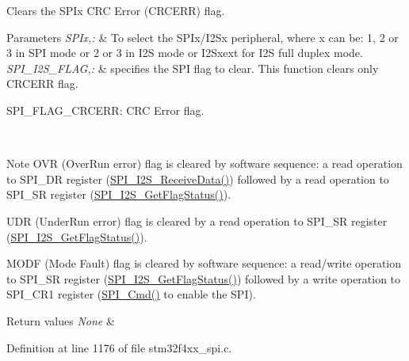 Clears the S\-P\-Ix C\-R\-C Error (C\-R\-C\-E\-R\-R) flag. 


\begin{DoxyParams}{Parameters}
{\em S\-P\-Ix,\-:} & To select the S\-P\-Ix/\-I2\-Sx peripheral, where x can be\-: 1, 2 or 3 in S\-P\-I mode or 2 or 3 in I2\-S mode or I2\-Sxext for I2\-S full duplex mode. \\
\hline
{\em S\-P\-I\-\_\-\-I2\-S\-\_\-\-F\-L\-A\-G,\-:} & specifies the S\-P\-I flag to clear. This function clears only C\-R\-C\-E\-R\-R flag. \begin{DoxyItemize}
\item S\-P\-I\-\_\-\-F\-L\-A\-G\-\_\-\-C\-R\-C\-E\-R\-R\-: C\-R\-C Error flag.\end{DoxyItemize}
\\
\hline
\end{DoxyParams}
\begin{DoxyNote}{Note}
O\-V\-R (Over\-Run error) flag is cleared by software sequence\-: a read operation to S\-P\-I\-\_\-\-D\-R register (\hyperlink{group___s_p_i_gab77de76547f3bff403236b263b070a30}{S\-P\-I\-\_\-\-I2\-S\-\_\-\-Receive\-Data()}) followed by a read operation to S\-P\-I\-\_\-\-S\-R register (\hyperlink{group___s_p_i_ga1bd785d129e09c5734a876c8f2767204}{S\-P\-I\-\_\-\-I2\-S\-\_\-\-Get\-Flag\-Status()}). 

U\-D\-R (Under\-Run error) flag is cleared by a read operation to S\-P\-I\-\_\-\-S\-R register (\hyperlink{group___s_p_i_ga1bd785d129e09c5734a876c8f2767204}{S\-P\-I\-\_\-\-I2\-S\-\_\-\-Get\-Flag\-Status()}). 

M\-O\-D\-F (Mode Fault) flag is cleared by software sequence\-: a read/write operation to S\-P\-I\-\_\-\-S\-R register (\hyperlink{group___s_p_i_ga1bd785d129e09c5734a876c8f2767204}{S\-P\-I\-\_\-\-I2\-S\-\_\-\-Get\-Flag\-Status()}) followed by a write operation to S\-P\-I\-\_\-\-C\-R1 register (\hyperlink{group___s_p_i_gaa31357879a65ee1ed7223f3b9114dcf3}{S\-P\-I\-\_\-\-Cmd()} to enable the S\-P\-I).
\end{DoxyNote}

\begin{DoxyRetVals}{Return values}
{\em None} & \\
\hline
\end{DoxyRetVals}


Definition at line 1176 of file stm32f4xx\-\_\-spi.\-c.

